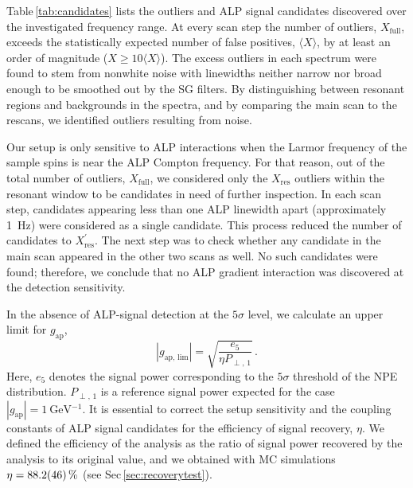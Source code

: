 \documentclass[superscriptaddress,
floatfix,
reprint,
nofootinbib,
amsmath,amssymb,
aps,
prd,
]{revtex4-2}
\begin{document}
Table\,\ref{tab:candidates} lists the outliers and ALP signal candidates discovered over the investigated frequency range.
At every scan step the number of outliers, $X_\mathrm{full}$, exceeds the statistically expected number of false positives, $\langle X \rangle$, by at least an order of magnitude ($X \geq 10 \langle X \rangle$). 
The excess outliers in each spectrum were found to stem from nonwhite noise with linewidths neither narrow nor broad enough to be smoothed out by the SG filters. 
By distinguishing between resonant regions and backgrounds in the spectra, and by comparing the main scan to the rescans, we identified outliers resulting from noise.

Our setup is only sensitive to ALP interactions when the Larmor frequency of the sample spins is near the ALP Compton frequency. 
For that reason, out of the total number of outliers, $X_\mathrm{full}$, we considered only the $X_\mathrm{res}$ outliers within the resonant window to be candidates in need of further inspection.
In each scan step, candidates appearing less than one ALP linewidth apart (approximately \SI{1}{Hz}) were considered as a single candidate. This process reduced the number of candidates to $X^{'}_\mathrm{res}$.
The next step was to check whether any candidate in the main scan appeared in the other two scans as well. 
No such candidates were found; therefore, we conclude that no ALP gradient interaction was discovered at the detection sensitivity. 

In the absence of ALP-signal detection at the $5\sigma$ level, we calculate an upper limit for $g_{\mathrm{ap}}$,
\begin{equation}\label{eq:limcouple}
    |g_{\mathrm{ap,\, lim}} | = \sqrt{ \frac{ e_{5} } { \eta P_{\perp,\,1} } }\,.
\end{equation}
Here, $e_{5}$ denotes the signal power corresponding to the $5\sigma$ threshold of the NPE distribution. 
$P_{\perp,\,1}$ is a reference signal power expected for the case $|g_{\mathrm{ap}}|=\SI{1}{\GeV^{-1}}$. 
It is essential to correct the setup sensitivity and the coupling constants of ALP signal candidates for the efficiency of signal recovery, $\eta$.
We defined the efficiency of the analysis as the ratio of signal power recovered by the analysis to its original value, and we obtained with MC simulations $\eta=\SI{88.2\pm 4.6}{\%}$ (see Sec\,\ref{sec:recoverytest}). 
\end{document}

